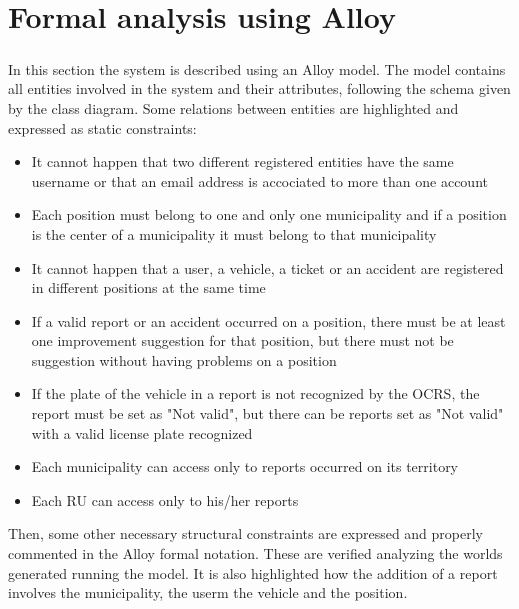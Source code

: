 \chapter{Formal analysis using Alloy}
	\paragraph{}
		In this section the system is described using an Alloy model.
		The model contains all entities involved in the system and their attributes, following the schema given by the class diagram.
		Some relations between entities are highlighted and expressed as static constraints:
		\begin{itemize}
			\item It cannot happen that two different registered entities have the same username or that an email address is accociated to more than one account
			\item Each position must belong to one and only one municipality and if a position is the center of a municipality it must belong to that municipality
			\item It cannot happen that a user, a vehicle, a ticket or an accident are registered in different positions at the same time
			\item If a valid report or an accident occurred on a position, there must be at least one improvement suggestion for that position, but there must not be suggestion without having problems on a position
			\item If the plate of the vehicle in a report is not recognized by the OCRS, the report must be set as "Not valid", but there can be reports set as "Not valid" with a valid license plate recognized
			\item Each municipality can access only to reports occurred on its territory
			\item Each RU can access only to his/her reports
		\end{itemize}
		
		Then, some other necessary structural constraints are expressed and properly commented in the Alloy formal notation. These are verified analyzing the worlds generated running the model.
		It is also highlighted how the addition of a report involves the municipality, the userm the vehicle and the position.
		\clearpage

